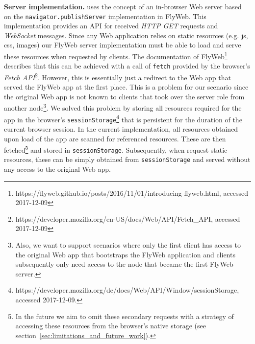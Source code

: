 \noindent\textbf{Server implementation.}
\APIName uses the concept of an in-browser Web server based on the \texttt{navigator.publishServer} implementation in FlyWeb.
This implementation provides an API for received \textit{HTTP GET} requests and \textit{WebSocket} messages.
Since any Web application relies on static resources (e.g. js, css, images) our FlyWeb server implementation must be able to load and serve these resources when requested by clients.
The documentation of FlyWeb\footnote{https://flyweb.github.io/posts/2016/11/01/introducing-flyweb.html, accessed 2017-12-09} describes that this can be achieved with a call of \texttt{fetch} provided by the browser's \textit{Fetch API}\footnote{https://developer.mozilla.org/en-US/docs/Web/API/Fetch\_API, accessed 2017-12-09}.
However, this is essentially just a redirect to the Web app that served the FlyWeb app at the first place.
This is a problem for our scenario since the original Web app is not known to clients that took over the server role from another node\footnote{Also, we want to support scenarios where only the first client has access to the original Web app that bootstraps the FlyWeb application and clients subsequently only need access to the node that became the first FlyWeb server.}.
We solved this problem by storing all resources required for the \APIshort app in the browser's \texttt{sessionStorage}\footnote{https://developer.mozilla.org/de/docs/Web/API/Window/sessionStorage, accessed 2017-12-09.} that is persistent for the duration of the current browser session.
In the current implementation, all resources obtained upon load of the app are scanned for referenced resources.
These are then fetched\footnote{In the future we aim to omit these secondary requests with a strategy of accessing these resources from the browser's native storage (see section~\ref{sec:limitations_and_future_work}).} and stored in \texttt{sessionStorage}.
Subsequently, when \APIshort request static resources, these can be simply obtained from \texttt{sessionStorage} and served without any access to the original Web app.


